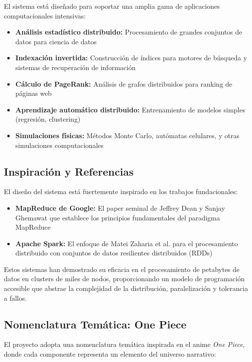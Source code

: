 El sistema está diseñado para soportar una amplia gama de aplicaciones computacionales intensivas:

\begin{itemize}
    \item \textbf{Análisis estadístico distribuido:} Procesamiento de grandes conjuntos de datos para ciencia de datos
    \item \textbf{Indexación invertida:} Construcción de índices para motores de búsqueda y sistemas de recuperación de información
    \item \textbf{Cálculo de PageRank:} Análisis de grafos distribuidos para ranking de páginas web
    \item \textbf{Aprendizaje automático distribuido:} Entrenamiento de modelos simples (regresión, clustering)
    \item \textbf{Simulaciones físicas:} Métodos Monte Carlo, autómatas celulares, y otras simulaciones computacionales
\end{itemize}

\subsection{Inspiración y Referencias}

El diseño del sistema está fuertemente inspirado en los trabajos fundacionales:

\begin{itemize}
    \item \textbf{MapReduce de Google:} El paper seminal de Jeffrey Dean y Sanjay Ghemawat \cite{MapReduceGoogle} que establece los principios fundamentales del paradigma MapReduce
    \item \textbf{Apache Spark:} El enfoque de Matei Zaharia et al. \cite{SparkClusters} para el procesamiento distribuido con conjuntos de datos resilientes distribuidos (RDDs)
\end{itemize}

Estos sistemas han demostrado su eficacia en el procesamiento de petabytes de datos en clusters de miles de nodos, proporcionando un modelo de programación accesible que abstrae la complejidad de la distribución, paralelización y tolerancia a fallos.

\subsection{Nomenclatura Temática: One Piece}

El proyecto adopta una nomenclatura temática inspirada en el anime \emph{One Piece}, donde cada componente representa un elemento del universo narrativo:

